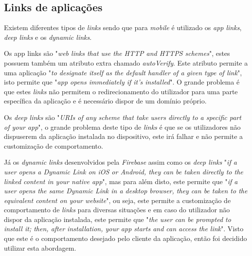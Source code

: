 \subsection{Links de aplicações}

Existem diferentes tipos de \textit{links} sendo que para \textit{mobile} é utilizado os \textit{app links}, \textit{deep links} e os \textit{dynamic links}.

Os app links são "\emph{web links that use the HTTP and HTTPS schemes}"\citep{linking}, estes possuem também um atributo extra chamado \textit{autoVerify}. Este atributo permite a uma aplicação "\emph{to designate itself as the default handler of a given type of link}"\citep{linking}, isto permite que "\emph{app opens immediately if it's installed}"\citep{linking}. O grande problema é que estes \textit{links} não permitem o redirecionamento do utilizador para uma parte específica da aplicação e é necessário dispor de um domínio próprio.


Os \textit{deep links} são "\emph{URIs of any scheme that take users directly to a specific part of your app}"\citep{linking}, o grande problema deste tipo de \textit{links} é que se os utilizadores não dispuserem da aplicação instalada no dispositivo, este irá falhar e não permite a customização de comportamento.

Já os \textit{dynamic links} desenvolvidos pela \textit{Firebase} assim como os \textit{deep links} "\emph{if a user opens a Dynamic Link on iOS or Android, they can be taken directly to the linked content in your native app}"\citep{dynamic_linking}, mas para além disto, este permite que "\emph{if a user opens the same Dynamic Link in a desktop browser, they can be taken to the equivalent content on your website}"\citep{dynamic_linking}, ou seja, este permite a customização de comportamento de \textit{links} para diversas situações e em caso do utilizador não dispor da aplicação instalada, este permite que "\emph{the user can be prompted to install it; then, after installation, your app starts and can access the link}"\citep{dynamic_linking}. Visto que este é o comportamento desejado pelo cliente da aplicação, então foi decidido utilizar esta abordagem.
